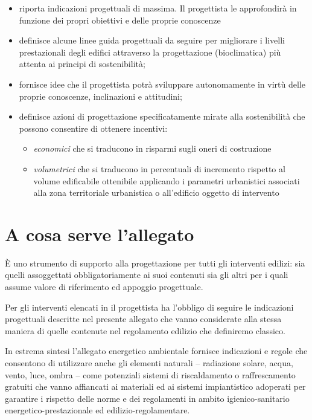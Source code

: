 \begin{itemize}
\item riporta indicazioni progettuali di massima. Il progettista le approfondirà in funzione dei propri obiettivi e delle proprie conoscenze

\item definisce alcune linee guida progettuali da seguire per migliorare i livelli prestazionali degli edifici attraverso la progettazione (bioclimatica) più attenta ai principi di sostenibilità;

\item fornisce idee che il progettista potrà sviluppare autonomamente in virtù delle proprie conoscenze, inclinazioni e attitudini;

\item definisce azioni di progettazione specificatamente mirate alla sostenibilità che possono consentire di ottenere incentivi:

\begin{itemize}
\item \emph{economici} che si traducono in risparmi sugli oneri di costruzione

\item \emph{volumetrici} che si traducono in percentuali di incremento rispetto al volume edificabile ottenibile applicando i parametri urbanistici associati alla zona territoriale urbanistica o all'edificio oggetto di intervento

\end{itemize}

\end{itemize}

\section{A cosa serve l'allegato}
\label{acosaservelallegato}

È uno strumento di supporto alla progettazione per tutti gli interventi edilizi: sia quelli assoggettati obbligatoriamente ai suoi contenuti sia gli altri per i quali assume valore di riferimento ed appoggio progettuale.

Per gli interventi elencati in  il progettista ha l'obbligo di seguire le indicazioni progettuali descritte nel presente allegato che vanno considerate alla stessa maniera di quelle contenute nel regolamento edilizio che definiremo classico.

In estrema sintesi l'allegato energetico ambientale fornisce indicazioni e regole che consentono di utilizzare anche gli elementi naturali – radiazione solare, acqua, vento, luce, ombra – come potenziali sistemi di riscaldamento o raffrescamento gratuiti che vanno affiancati ai materiali ed ai sistemi impiantistico adoperati per garantire i rispetto delle norme e dei regolamenti in ambito igienico-sanitario energetico-prestazionale ed edilizio-regolamentare.

